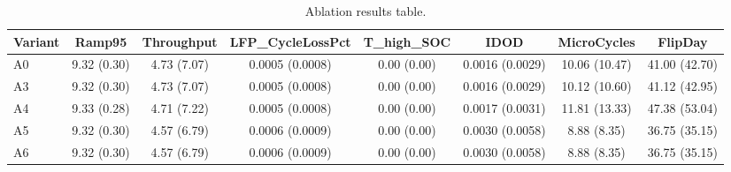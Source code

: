 \begin{table}[t]
\centering
\caption{Ablation results table.}
\label{tab:ablation_auto}
\begin{tabular}{lccccccc}
\toprule
Variant & Ramp95 & Throughput & LFP\_CycleLossPct & T\_high\_SOC & IDOD & MicroCycles & FlipDay \\
\midrule
A0 & 9.32 (0.30) & 4.73 (7.07) & 0.0005 (0.0008) & 0.00 (0.00) & 0.0016 (0.0029) & 10.06 (10.47) & 41.00 (42.70) \\
A3 & 9.32 (0.30) & 4.73 (7.07) & 0.0005 (0.0008) & 0.00 (0.00) & 0.0016 (0.0029) & 10.12 (10.60) & 41.12 (42.95) \\
A4 & 9.33 (0.28) & 4.71 (7.22) & 0.0005 (0.0008) & 0.00 (0.00) & 0.0017 (0.0031) & 11.81 (13.33) & 47.38 (53.04) \\
A5 & 9.32 (0.30) & 4.57 (6.79) & 0.0006 (0.0009) & 0.00 (0.00) & 0.0030 (0.0058) & 8.88 (8.35) & 36.75 (35.15) \\
A6 & 9.32 (0.30) & 4.57 (6.79) & 0.0006 (0.0009) & 0.00 (0.00) & 0.0030 (0.0058) & 8.88 (8.35) & 36.75 (35.15) \\
\bottomrule
\end{tabular}
\end{table}